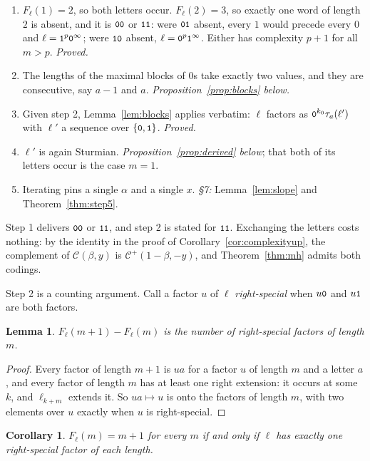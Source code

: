 \documentclass[11pt,a4paper]{article}
\newcommand{\seq}[1]{\texttt{\small #1}}
\newcommand{\C}{\mathcal{C}}
\newcommand{\Cp}{\mathcal{C}^{+}}
\theoremstyle{definition}
\theoremstyle{plain}
\newtheorem{lemma}[definition]{Lemma}
\newtheorem{corollary}[definition]{Corollary}
\begin{document}
\begin{enumerate}
\item $F_\ell(1) = 2$, so both letters occur. $F_\ell(2) = 3$, so exactly one
  word of length $2$ is absent, and it is $\seq{00}$ or $\seq{11}$: were
  $\seq{01}$ absent, every $1$ would precede every $0$ and
  $\ell = \seq{1}^p\seq{0}^\infty$; were $\seq{10}$ absent,
  $\ell = \seq{0}^p\seq{1}^\infty$. Either has complexity $p+1$ for all
  $m > p$. \emph{Proved.}
\item The lengths of the maximal blocks of $0$s take exactly two values, and
  they are consecutive, say $a-1$ and $a$. \emph{Proposition~\ref{prop:blocks}
  below.}
\item Given step 2, Lemma~\ref{lem:blocks} applies verbatim: $\ell$ factors as
  $\seq{0}^{k_0}\tau_a(\ell')$ with $\ell'$ a sequence over
  $\{\seq{0},\seq{1}\}$. \emph{Proved.}
\item $\ell'$ is again Sturmian. \emph{Proposition~\ref{prop:derived} below};
  that both of its letters occur is the case $m = 1$.
\item Iterating pins a single $\alpha$ and a single $x$. \emph{\S7:}
  Lemma~\ref{lem:slope} and Theorem~\ref{thm:step5}.
\end{enumerate}

Step 1 delivers $\seq{00}$ or $\seq{11}$, and step 2 is stated for $\seq{11}$.
Exchanging the letters costs nothing: by the identity in the proof of
Corollary~\ref{cor:complexityup}, the complement of $\C(\beta,y)$ is
$\Cp(1-\beta,-y)$, and Theorem~\ref{thm:mh} admits both codings.

Step 2 is a counting argument. Call a factor $u$ of $\ell$ \emph{right-special}
when $u\seq{0}$ and $u\seq{1}$ are both factors.

\begin{lemma}\label{lem:rs}
$F_\ell(m+1) - F_\ell(m)$ is the number of right-special factors of length $m$.
\end{lemma}

\begin{proof}
Every factor of length $m+1$ is $ua$ for a factor $u$ of length $m$ and a letter
$a$, and every factor of length $m$ has at least one right extension: it occurs
at some $k$, and $\ell_{k+m}$ extends it. So $ua \mapsto u$ is onto the factors
of length $m$, with two elements over $u$ exactly when $u$ is right-special.
\end{proof}

\begin{corollary}\label{cor:onesp}
$F_\ell(m) = m+1$ for every $m$ if and only if $\ell$ has exactly one
right-special factor of each length.
\end{corollary}
\end{document}
